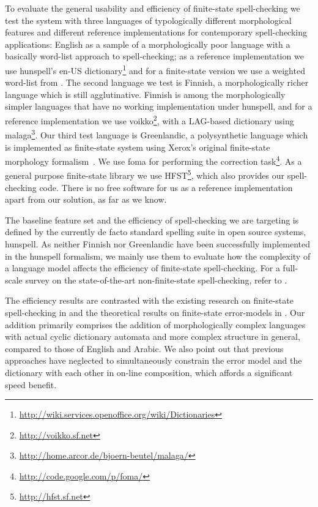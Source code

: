 \documentclass[11pt]{article}
\begin{document}
To evaluate the general usability and efficiency of finite-state spell-checking
we test the system with three languages of typologically different
morphological features and different reference implementations for contemporary
spell-checking applications: English as a sample of a morphologically poor
language with a basically word-list approach to spell-checking; as a reference
implementation we use hunspell's en-US
dictionary\footnote{\url{http://wiki.services.openoffice.org/wiki/Dictionaries}}
and for a finite-state version we use a weighted word-list from
. The second language we test is Finnish, a
morphologically richer language which is still agglutinative. Finnish is among
the morphologically simpler languages that have no working implementation under
hunspell, and for a reference implementation we use
voikko\footnote{\url{http://voikko.sf.net}}, with a LAG-based dictionary using
malaga\footnote{\url{http://home.arcor.de/bjoern-beutel/malaga/}}. Our third
test language is Greenlandic, a polysynthetic language which is implemented as
finite-state system using Xerox's original finite-state morphology
formalism~\cite{beesley/2003}. We use foma for performing the correction
task\footnote{\url{http://code.google.com/p/foma/}}.
As a general purpose finite-state library we use
HFST\footnote{\url{http://hfst.sf.net}}, which also provides our spell-checking
code. There is no free software for us as a
reference implementation apart from our solution, as far as we know.

The baseline feature set and the efficiency of spell-checking we are targeting
is defined by the currently de facto standard spelling suite in open source
systems, hunspell. As neither Finnish nor Greenlandic have been successfully
implemented in the hunspell formalism, we mainly use them to evaluate how
the complexity of a language model affects the efficiency of finite-state
spell-checking. For a full-scale survey on the state-of-the-art
non-finite-state spell-checking, refer to .

The efficiency results are contrasted with the existing research on
finite-state spell-checking in  and the theoretical
results on finite-state error-models in .
Our addition primarily comprises the
addition of morphologically complex languages with actual cyclic
dictionary automata and more complex structure in general, compared to those of
English and Arabic. We also point out that previous approaches have
neglected to simultaneously constrain the error model and the dictionary with
each other in on-line composition, which affords a significant speed benefit.
\end{document}

